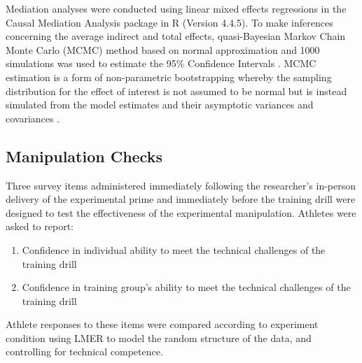 Mediation analyses were conducted using linear mixed effects regressions in the Causal Mediation Analysis package in R (Version 4.4.5).  To make inferences concerning the average indirect and total effects, quasi-Bayesian Markov Chain Monte Carlo (MCMC) method based on normal approximation and 1000 simulations was used to estimate the 95\% Confidence Intervals \citep{Tofighi2016a,Imai2010}. MCMC estimation is a form of non-parametric bootstrapping whereby the sampling distribution for the effect of interest is not assumed to be normal but is instead simulated from the model estimates and their asymptotic variances and covariances \cite{Preacher2008}.



\subsection{Manipulation Checks\label{sec:manChecksDrill}}
Three survey items administered immediately following the researcher's in-person delivery of the experimental prime and immediately before the training drill were designed to test the effectiveness of the experimental manipulation.  Athletes were asked to report:

\begin{enumerate}
  \item Confidence in individual ability to meet the technical challenges of the training drill
  \item Confidence in training group's ability to meet the technical challenges of the training drill
\end{enumerate}

Athlete responses to these items were compared according to experiment condition using LMER to model the random structure of the data, and controlling for technical competence.


































